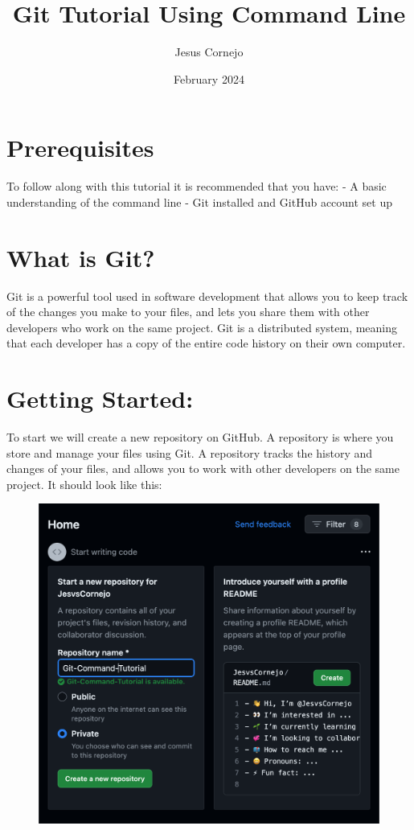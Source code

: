 \documentclass{article}
\title{Git Tutorial Using Command Line}
\author{Jesus Cornejo}
\date{February 2024}
\begin{document}
\maketitle
\section{Prerequisites}
To follow along with this tutorial it is recommended that you have:
- A basic understanding of the command line
- Git installed and GitHub account set up
\section{What is Git?}
Git is a powerful tool used in software development that allows you to keep track of the changes you make to your files, and lets you share them with other developers who work on the same project. Git is a distributed system, meaning that each developer has a copy of the entire code history on their own computer. 
\section{Getting Started:}
To start we will create a new repository on GitHub.
A repository is where you store and manage your files using Git. A repository tracks the history and changes of your files, and allows you to work with other developers on the same project.
It should look like this: 

\begin{figure}[ht]
\includegraphics[scale = 0.5]{screenshots/sc1.png}
\centering
\end{figure}
\end{document}
